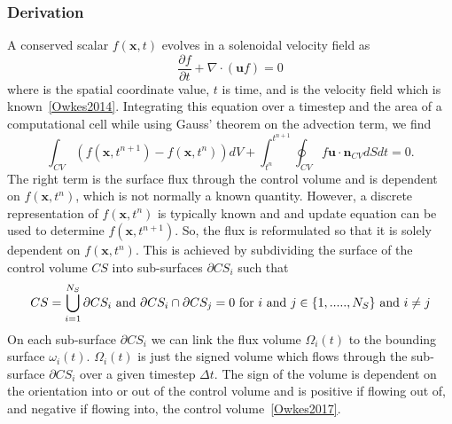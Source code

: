 \subsubsection{Derivation}
A conserved scalar $f(\bm{x},t)$ evolves in a solenoidal velocity field as 
\begin{equation}
	\frac{\partial f}{\partial t} + \nabla \cdot (\bm{u} f) = 0
	\label{eqn:der1}
\end{equation}
where  is the spatial coordinate value, $t$ is time, and  is the velocity field which is known~\ref{Owkes2014}. Integrating this equation over a timestep and the area of a computational cell while using Gauss' theorem on the advection term, we find 
\begin{equation}
\int_{CV} (  f(\bm{x}, t^{n+1})  - f(\bm{x}, t^{n})  ) dV  + \int_{t^n}^{t^{n+1}} \oint_{CV} f \bm{u} \cdot \bm{n}_{CV} dS dt = 0.
	\label{eqn:der2}
\end{equation}
The right term is the surface flux through the control volume and is dependent on $f( \bm{x}, t^{n})$, which is not normally a known quantity. However, a discrete representation of $f( \bm{x}, t^{n})$ is typically known and and update equation can be used to determine $f( \bm{x}, t^{n+1})$. So, the flux is reformulated so that it is solely dependent on $f( \bm{x}, t^{n})$. This is achieved by subdividing the surface of the control volume $CS$ into sub-surfaces $\partial{CS_i}$ such that 
\begin{equation}
	CS = \bigcup_{i=1}^{N_S} \partial CS_i \text{  and  } \\
	\partial CS_i \cap \partial CS_j = 0 \text{ for } i \text{ and } j \in \{1,.....,N_S \} \text{ and } i \not = j
		\label{eqn:der3}
\end{equation}
On each sub-surface $\partial CS_i$ we can link the flux volume $\Omega_i(t)$ to the bounding surface $\omega_i(t)$. $\Omega_i(t)$ is just the signed volume which flows through the sub-surface $\partial CS_i$ over a given timestep $\Delta t$.  The sign of the volume is dependent on the orientation into or out of the control volume and is positive if flowing out of, and negative if flowing into, the control volume~\ref{Owkes2017}. 

